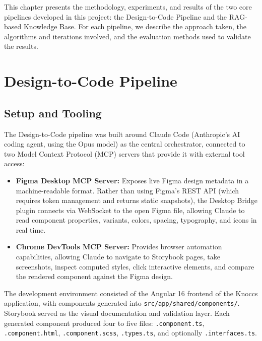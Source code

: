 This chapter presents the methodology, experiments, and results of the two core pipelines developed in this project: the Design-to-Code Pipeline and the RAG-based Knowledge Base. For each pipeline, we describe the approach taken, the algorithms and iterations involved, and the evaluation methods used to validate the results.


\section{Design-to-Code Pipeline}

\subsection{Setup and Tooling}

The Design-to-Code pipeline was built around Claude Code (Anthropic's AI coding agent, using the Opus model) as the central orchestrator, connected to two Model Context Protocol (MCP) servers that provide it with external tool access:

\begin{itemize}
    \item \textbf{Figma Desktop MCP Server:} Exposes live Figma design metadata in a machine-readable format. Rather than using Figma's REST API (which requires token management and returns static snapshots), the Desktop Bridge plugin connects via WebSocket to the open Figma file, allowing Claude to read component properties, variants, colors, spacing, typography, and icons in real time.
    
    \item \textbf{Chrome DevTools MCP Server:} Provides browser automation capabilities, allowing Claude to navigate to Storybook pages, take screenshots, inspect computed styles, click interactive elements, and compare the rendered component against the Figma design.
\end{itemize}

The development environment consisted of the Angular 16 frontend of the Knoccs application, with components generated into \texttt{src/app/shared/components/}. Storybook served as the visual documentation and validation layer. Each generated component produced four to five files: \texttt{.component.ts}, \texttt{.component.html}, \texttt{.component.scss}, \texttt{.types.ts}, and optionally \texttt{.interfaces.ts}.

